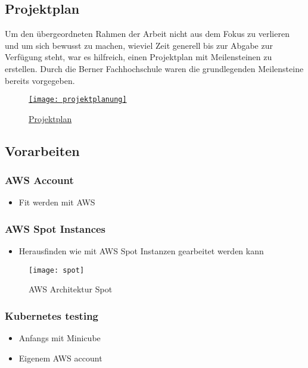 \subsection{Projektplan}\label{chap:projektplan}
Um den übergeordneten Rahmen der Arbeit nicht aus dem Fokus zu verlieren und um sich bewusst zu machen, wieviel Zeit generell bis zur Abgabe zur Verfügung steht, war es hilfreich, einen Projektplan mit Meilensteinen zu erstellen. Durch die Berner Fachhochschule waren die grundlegenden Meilensteine bereits vorgegeben.

\begin{figure}[H]
	\centering
	\href{https://docs.google.com/spreadsheets/d/1zKTZgt4BW736G0xRfU9o3vWYwAJj-8nzFvGsPR7yJ_0/edit?usp=sharing}{
	\texttt{[image: projektplanung]}}
	\caption{\href{https://docs.google.com/spreadsheets/d/1zKTZgt4BW736G0xRfU9o3vWYwAJj-8nzFvGsPR7yJ_0/edit?usp=sharing}{Projektplan}}
	\label{fig:Projektplan}
\end{figure}

\subsection{Vorarbeiten}
\subsubsection{AWS Account}
\begin{itemize}
	\item Fit werden mit AWS
\end{itemize}

\subsubsection{AWS Spot Instances}
\begin{itemize}
	\item Herausfinden wie mit AWS Spot Instanzen gearbeitet werden kann
\end{itemize}
\begin{figure}[H]
	\centering
	\texttt{[image: spot]}
	\caption{AWS Architektur Spot\cite{AmazonAWSSpot:1}}
	\label{fig:AWS Architektur Spot}
\end{figure}

\subsubsection{Kubernetes testing}
\begin{itemize}
	\item Anfangs mit Minicube
	\item Eigenem AWS account
\end{itemize}
